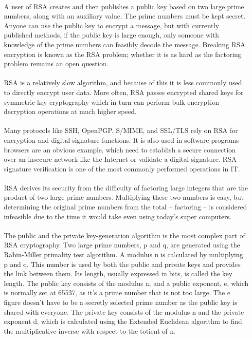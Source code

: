 \documentclass[a4paper,12pt]{article}
\begin{document}
	\paragraph{} A user of RSA creates and then publishes a public key based on two large prime numbers, along with an auxiliary value. The prime numbers must be kept secret. Anyone can use the public key to encrypt a message, but with currently published methods, if the public key is large enough, only someone with knowledge of the prime numbers can feasibly decode the message. Breaking RSA encryption is known as the RSA problem; whether it is as hard as the factoring problem remains an open question.
	\paragraph{} RSA is a relatively slow algorithm, and because of this it is less commonly used to directly encrypt user data. More often, RSA passes encrypted shared keys for symmetric key cryptography which in turn can perform bulk encryption-decryption operations at much higher speed.
	\paragraph{} Many protocols like SSH, OpenPGP, S/MIME, and SSL/TLS rely on RSA for encryption and digital signature functions. It is also used in software programs -- browsers are an obvious example, which need to establish a secure connection over an insecure network like the Internet or validate a digital signature. RSA signature verification is one of the most commonly performed operations in IT.
	\paragraph{} RSA derives its security from the difficulty of factoring large integers that are the product of two large prime numbers. Multiplying these two numbers is easy, but determining the original prime numbers from the total -- factoring -- is considered infeasible due to the time it would take even using today’s super computers.
	\paragraph{} The public and the private key-generation algorithm is the most complex part of RSA cryptography. Two large prime numbers, p and q, are generated using the Rabin-Miller primality test algorithm. A modulus n is calculated by multiplying p and q. This number is used by both the public and private keys and provides the link between them. Its length, usually expressed in bits, is called the key length. The public key consists of the modulus n, and a public exponent, e, which is  normally set at 65537, as it's a prime number that is not too large. The e figure  doesn't have to be a secretly selected prime number as the public key is shared with everyone. The private key consists of the modulus n and the private exponent d, which is calculated using the Extended Euclidean algorithm to find the multiplicative inverse with respect to the totient of n.
		
\end{document}
